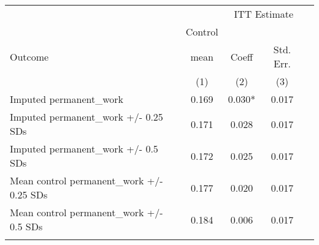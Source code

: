 \begin{tabular}{lcccc}
\hline \noalign{\smallskip} &  & \multicolumn{2}{c}{{ ITT Estimate}} & \\
\cline{3-4} & Control &  &  & \\
Outcome & mean & Coeff & Std. Err. & \\
 & (1) & (2) & (3) & \\
\noalign{\smallskip}\hline \noalign{\smallskip}Imputed permanent\_work & 0.169 & 0.030* & 0.017 & \\
Imputed permanent\_work +/- 0.25 SDs & 0.171 & 0.028 & 0.017 & \\
Imputed permanent\_work +/- 0.5 SDs & 0.172 & 0.025 & 0.017 & \\
Mean control permanent\_work +/- 0.25 SDs & 0.177 & 0.020 & 0.017 & \\
Mean control permanent\_work +/- 0.5 SDs & 0.184 & 0.006 & 0.017 & \\
\noalign{\smallskip}\hline\end{tabular}\\
